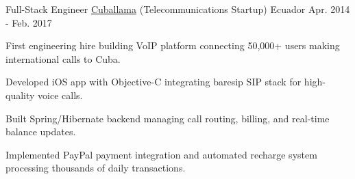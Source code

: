 \begin{cventries}
  \cventry
    {Full-Stack Engineer} %
    {\href{https://www.cuballama.com/}{Cuballama} (Telecommunications Startup)} %
    {Ecuador} %
    {Apr. 2014 - Feb. 2017} %
    {
      \begin{cvitems} %
        \item {First engineering hire building VoIP platform connecting 50,000+ users making international calls to Cuba.}
        \item {Developed iOS app with Objective-C integrating baresip SIP stack for high-quality voice calls.}
        \item {Built Spring/Hibernate backend managing call routing, billing, and real-time balance updates.}
        \item {Implemented PayPal payment integration and automated recharge system processing thousands of daily transactions.}
      \end{cvitems}
    }

\end{cventries}
